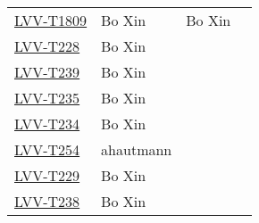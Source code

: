 \documentclass[SE,lsstdraft,STR,toc]{lsstdoc}
\begin{document}
{\begin{longtable}{p{3cm}p{3cm}p{3cm}p{6cm}}
\begin{minipage}[]{6cm}
\smallskip
{\small  }
\medskip
\end{minipage}
\\ \hline
\href{https://jira.lsstcorp.org/secure/Tests.jspa#/testCase/LVV-T1809}{LVV-T1809}
& {\small Bo Xin } & {\small Bo Xin } &
\begin{minipage}[]{6cm}
\smallskip
{\small  }
\medskip
\end{minipage}
\\ \hline
\href{https://jira.lsstcorp.org/secure/Tests.jspa#/testCase/LVV-T228}{LVV-T228}
& {\small Bo Xin } & {\small  } &
\begin{minipage}[]{6cm}
\smallskip
{\small  }
\medskip
\end{minipage}
\\ \hline
\href{https://jira.lsstcorp.org/secure/Tests.jspa#/testCase/LVV-T239}{LVV-T239}
& {\small Bo Xin } & {\small  } &
\begin{minipage}[]{6cm}
\smallskip
{\small  }
\medskip
\end{minipage}
\\ \hline
\href{https://jira.lsstcorp.org/secure/Tests.jspa#/testCase/LVV-T235}{LVV-T235}
& {\small Bo Xin } & {\small  } &
\begin{minipage}[]{6cm}
\smallskip
{\small  }
\medskip
\end{minipage}
\\ \hline
\href{https://jira.lsstcorp.org/secure/Tests.jspa#/testCase/LVV-T234}{LVV-T234}
& {\small Bo Xin } & {\small  } &
\begin{minipage}[]{6cm}
\smallskip
{\small  }
\medskip
\end{minipage}
\\ \hline
\href{https://jira.lsstcorp.org/secure/Tests.jspa#/testCase/LVV-T254}{LVV-T254}
& {\small ahautmann } & {\small  } &
\begin{minipage}[]{6cm}
\smallskip
{\small  }
\medskip
\end{minipage}
\\ \hline
\href{https://jira.lsstcorp.org/secure/Tests.jspa#/testCase/LVV-T229}{LVV-T229}
& {\small Bo Xin } & {\small  } &
\begin{minipage}[]{6cm}
\smallskip
{\small  }
\medskip
\end{minipage}
\\ \hline
\href{https://jira.lsstcorp.org/secure/Tests.jspa#/testCase/LVV-T238}{LVV-T238}
& {\small Bo Xin } & {\small  } &
\begin{minipage}[]{6cm}
\smallskip
{\small  }

\end{minipage}
\end{longtable}}
\end{document}
